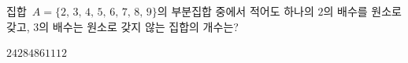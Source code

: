 집합~$A=\{2,\,3,\,4,\,5,\,6,\,7,\,8,\,9\}$의 부분집합 중에서 적어도 하나의 $2$의 배수를 원소로 갖고, $3$의 배수는 원소로 갖지 않는 집합의 개수는?
\begin{choices32}{$24$}{$28$}{$48$}{$61$}{$112$}\end{choices32}
